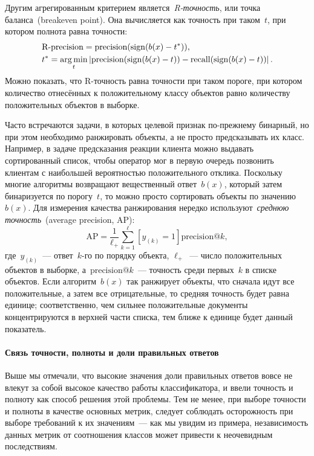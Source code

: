 \documentclass[12pt,fleqn]{article}
\begin{document}
Другим агрегированным критерием является~\emph{R-точность},
или точка баланса~(breakeven point).
Она вычисляется как точность при таком~$t$, при котором полнота равна точности:
\begin{align*}
    &\text{R-precision}
    =
    \text{precision}(\mathop{\rm sign}\limits(b(x) - t^*)),\\
    &t^* = \mathop{\rm arg\,min}\limits_t \left|
        \text{precision}(\mathop{\rm sign}\limits(b(x) - t))
        -
        \text{recall}(\mathop{\rm sign}\limits(b(x) - t))
    \right|.
\end{align*}
Можно показать, что R-точность равна точности при таком пороге,
при котором количество отнесённых к положительному классу объектов
равно количеству положительных объектов в выборке.

Часто встречаются задачи, в которых целевой признак по-прежнему бинарный,
но при этом необходимо ранжировать объекты, а не просто предсказывать их класс.
Например, в задаче предсказания реакции клиента можно выдавать сортированный список,
чтобы оператор мог в первую очередь позвонить клиентам с наибольшей вероятностью
положительного отклика.
Поскольку многие алгоритмы возвращают вещественный ответ~$b(x)$,
который затем бинаризуется по порогу~$t$,
то можно просто сортировать объекты по значению~$b(x)$.
Для измерения качества ранжирования нередко используют~\emph{среднюю точность}~(average precision, AP):
\[
    \text{AP}
    =
    \frac{1}{\ell_{+}}
    \sum_{k = 1}^{\ell}
        [y_{(k)} = 1] \text{precision}@k,
\]
где~$y_{(k)}$~--- ответ~$k$-го по порядку объекта,
$\ell_{+}$~--- число положительных объектов в выборке,
а~$\text{precision}@k$~--- точность среди первых~$k$ в списке объектов.
Если алгоритм~$b(x)$ так ранжирует объекты, что сначала идут все положительные,
а затем все отрицательные, то средняя точность будет равна единице;
соответственно, чем сильнее положительные документы концентрируются в верхней
части списка, тем ближе к единице будет данный показатель.

\paragraph{Связь точности, полноты и доли правильных ответов}
Выше мы отмечали, что высокие значения доли правильных ответов вовсе не влекут
за собой высокое качество работы классификатора,
и ввели точность и полноту как способ решения этой проблемы.
Тем не менее, при выборе точности и полноты в качестве основных метрик, следует
соблюдать осторожность при выборе требований к их значениям~--- как мы увидим из примера,
независимость данных метрик от соотношения классов может привести к неочевидным последствиям.
\end{document}

